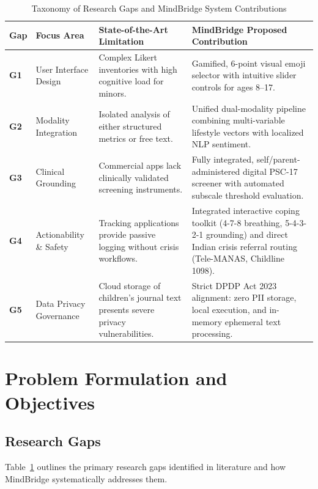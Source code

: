 \documentclass[conference]{IEEEtran}
\begin{document}
\begin{table}[t]
\centering
\caption{Taxonomy of Research Gaps and MindBridge System Contributions}
\label{tab:research_gaps}
\begin{tabularx}{\textwidth}{l p{3.2cm} X X}
\toprule
\textbf{Gap} & \textbf{Focus Area} & \textbf{State-of-the-Art Limitation} & \textbf{MindBridge Proposed Contribution} \\
\midrule
\textbf{G1} & User Interface Design & Complex Likert inventories with high cognitive load for minors. & Gamified, 6-point visual emoji selector with intuitive slider controls for ages 8--17. \\
\addlinespace
\textbf{G2} & Modality Integration & Isolated analysis of either structured metrics or free text. & Unified dual-modality pipeline combining multi-variable lifestyle vectors with localized NLP sentiment. \\
\addlinespace
\textbf{G3} & Clinical Grounding & Commercial apps lack clinically validated screening instruments. & Fully integrated, self/parent-administered digital PSC-17 screener with automated subscale threshold evaluation. \\
\addlinespace
\textbf{G4} & Actionability \& Safety & Tracking applications provide passive logging without crisis workflows. & Integrated interactive coping toolkit (4-7-8 breathing, 5-4-3-2-1 grounding) and direct Indian crisis referral routing (Tele-MANAS, Childline 1098). \\
\addlinespace
\textbf{G5} & Data Privacy Governance & Cloud storage of children's journal text presents severe privacy vulnerabilities. & Strict DPDP Act 2023 alignment: zero PII storage, local execution, and in-memory ephemeral text processing. \\
\bottomrule
\end{tabularx}
\end{table}

\section{Problem Formulation and Objectives}
\label{sec:problem}

\subsection{Research Gaps}
Table~\ref{tab:research_gaps} outlines the primary research gaps identified in literature and how MindBridge systematically addresses them.
\end{document}
